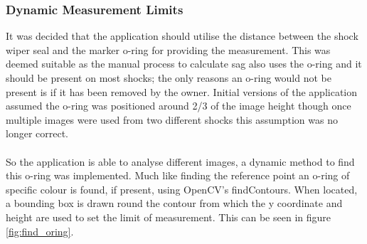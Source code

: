 	\subsubsection{Dynamic Measurement Limits}
		It was decided that the application should utilise the distance between the shock wiper seal and the marker o-ring for providing the measurement. This was deemed suitable as the manual process to calculate sag also uses the o-ring and it should be present on most shocks; the only reasons an o-ring would not be present is if it has been removed by the owner. Initial versions of the application assumed the o-ring was positioned around 2/3 of the image height though once multiple images were used from two different shocks this assumption was no longer correct.
		\\\\
		So the application is able to analyse different images, a dynamic method to find this o-ring was implemented. Much like finding the reference point an o-ring of specific colour is found, if present, using OpenCV's {\ttfamily findContours}. When located, a bounding box is drawn round the contour from which the y coordinate and height are used to set the limit of measurement. This can be seen in figure \ref{fig:find_oring}.

